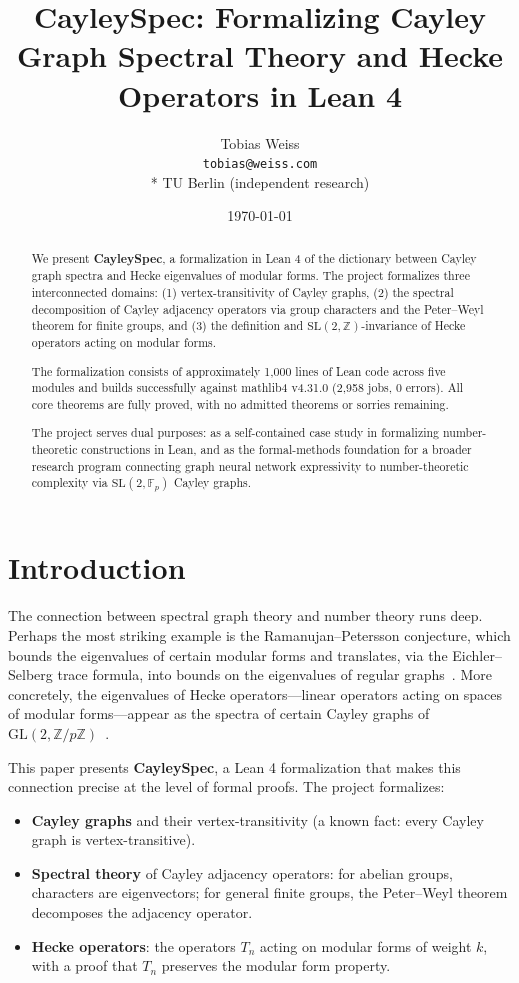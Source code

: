 \documentclass[11pt]{article}
\title{CayleySpec: Formalizing Cayley Graph Spectral Theory and Hecke Operators in Lean 4}
\author{Tobias Weiss\\
  \texttt{tobias@weiss.com}\\*
  \small TU Berlin (independent research)}
\date{\today}
\theoremstyle{plain}
\theoremstyle{definition}
\theoremstyle{remark}
\begin{document}
\maketitle

\begin{abstract}
We present \textbf{CayleySpec}, a formalization in Lean 4 of the dictionary between Cayley graph spectra and Hecke eigenvalues of modular forms.
The project formalizes three interconnected domains: (1) vertex-transitivity of Cayley graphs, (2) the spectral decomposition of Cayley adjacency operators via group characters and the Peter--Weyl theorem for finite groups, and (3) the definition and $\mathrm{SL}(2,\mathbb{Z})$-invariance of Hecke operators acting on modular forms.

The formalization consists of approximately 1,000 lines of Lean code across five modules and builds successfully against mathlib4 v4.31.0 (2,958 jobs, 0 errors).
All core theorems are fully proved, with no admitted theorems or sorries remaining.

The project serves dual purposes: as a self-contained case study in formalizing number-theoretic constructions in Lean, and as the formal-methods foundation for a broader research program connecting graph neural network expressivity to number-theoretic complexity via $\mathrm{SL}(2,\mathbb{F}_p)$ Cayley graphs.
\end{abstract}

\section{Introduction}

The connection between spectral graph theory and number theory runs deep.
Perhaps the most striking example is the Ramanujan--Petersson conjecture, which bounds the eigenvalues of certain modular forms and translates, via the Eichler--Selberg trace formula, into bounds on the eigenvalues of regular graphs~\cite{lubotzky1994discrete}.
More concretely, the eigenvalues of Hecke operators---linear operators acting on spaces of modular forms---appear as the spectra of certain Cayley graphs of $\mathrm{GL}(2,\mathbb{Z}/p\mathbb{Z})$~\cite{davidoff2003elementary}.

This paper presents \textbf{CayleySpec}, a Lean 4 formalization that makes this connection precise at the level of formal proofs.
The project formalizes:

\begin{itemize}
  \item \textbf{Cayley graphs} and their vertex-transitivity (a known fact: every Cayley graph is vertex-transitive).
  \item \textbf{Spectral theory} of Cayley adjacency operators: for abelian groups, characters are eigenvectors; for general finite groups, the Peter--Weyl theorem decomposes the adjacency operator.
  \item \textbf{Hecke operators}: the operators $T_n$ acting on modular forms of weight $k$, with a proof that $T_n$ preserves the modular form property.
\end{itemize}
\end{document}

